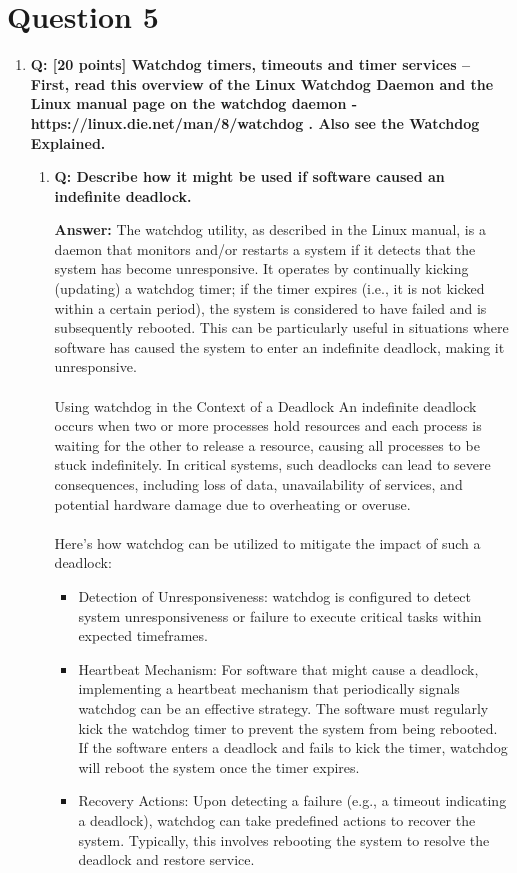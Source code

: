 \documentclass[a4paper,11pt]{article}%
\newenvironment{qanda}{\setlength{\parindent}{0pt}}{\bigskip}
\newcommand{\Q}{\bigskip\bfseries Q: }
\newcommand{\A}{\par\textbf{Answer: } \normalfont}
\begin{document}
\begin{qanda}
	\section{Question 5}
	\begin{enumerate}
		\item[] \Q [20 points] Watchdog timers, timeouts and timer services – First, read this overview of the
			Linux Watchdog Daemon and the Linux manual page on the watchdog daemon -
			https://linux.die.net/man/8/watchdog . Also see the Watchdog Explained.
			\begin{enumerate}
				\item \Q Describe how it might be used if software caused an indefinite deadlock.
				      \A
					  The watchdog utility, as described in the Linux manual, is a daemon that monitors and/or restarts a system if it detects that the system has become unresponsive. It operates by continually kicking (updating) a watchdog timer; if the timer expires (i.e., it is not kicked within a certain period), the system is considered to have failed and is subsequently rebooted. This can be particularly useful in situations where software has caused the system to enter an indefinite deadlock, making it unresponsive.\\\\

					  Using watchdog in the Context of a Deadlock
					  An indefinite deadlock occurs when two or more processes hold resources and each process is waiting for the other to release a resource, causing all processes to be stuck indefinitely. In critical systems, such deadlocks can lead to severe consequences, including loss of data, unavailability of services, and potential hardware damage due to overheating or overuse.\\\\
					  
					  Here’s how watchdog can be utilized to mitigate the impact of such a deadlock:
					  
					  \begin{itemize}
						\item Detection of Unresponsiveness: watchdog is configured to detect system unresponsiveness or failure to execute critical tasks within expected timeframes.
						\item  Heartbeat Mechanism: For software that might cause a deadlock, implementing a heartbeat mechanism that periodically signals watchdog can be an effective strategy. The software must regularly kick the watchdog timer to prevent the system from being rebooted. If the software enters a deadlock and fails to kick the timer, watchdog will reboot the system once the timer expires.
						\item Recovery Actions: Upon detecting a failure (e.g., a timeout indicating a deadlock), watchdog can take predefined actions to recover the system. Typically, this involves rebooting the system to resolve the deadlock and restore service.
					  \end{itemize}
					  

\end{enumerate}
\end{enumerate}
\end{qanda}
\end{document}
